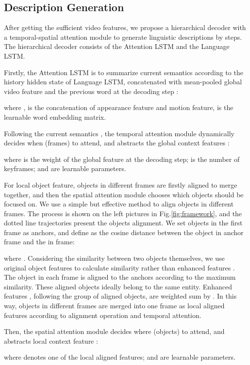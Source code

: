 \documentclass[10pt,twocolumn,letterpaper]{article}
\begin{document}
\subsection{Description Generation}

After getting the sufficient video features, we propose a hierarchical decoder with a temporal-spatial attention module to generate linguistic descriptions by steps. The hierarchical decoder consists of the Attention LSTM and the Language LSTM. 

Firstly, the Attention LSTM is to summarize current semantics  according to the history hidden state  of Language LSTM, concatenated with mean-pooled global video feature  and the previous word  at the decoding step :

where , is the concatenation of appearance feature and motion feature,  is the learnable word embedding matrix. 

Following the current semantics , the temporal attention module dynamically decides when (frames) to attend, and abstracts the global context features :


where  is the weight of the  global feature at the  decoding step;  is the number of keyframes;  and  are learnable parameters.

For local object feature, objects in different frames are firstly aligned to merge together, and then the spatial attention module chooses which objects should be focused on. We use a simple but effective method to align objects in different frames. The process is shown on the left pictures in Fig.\ref{fig:framework}, and the dotted line trajectories present the objects alignment. We set objects in the first frame as anchors, and define  as the cosine distance between the  object in anchor frame and the  in  frame:

where . Considering the similarity between two objects themselves, we use original object features  to calculate similarity rather than enhanced features . The object in each frame is aligned to the anchors according to the maximum similarity. These aligned objects ideally belong to the same entity. Enhanced features , following the group of aligned objects, are weighted sum by . In this way, objects in different frames are merged into one frame as local aligned features  according to alignment operation and temporal attention.

Then, the spatial attention module decides where (objects) to attend, and abstracts local context feature :


where  denotes one of the  local aligned features;  and  are learnable parameters.
\end{document}
